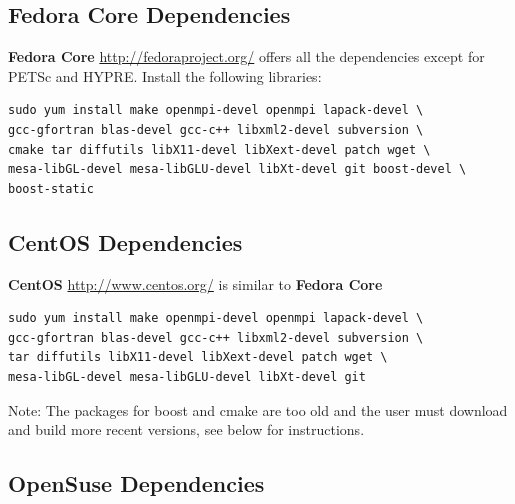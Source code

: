 \documentclass[12pt]{article}
\newcommand{\TT}[1]{\tt{#1} \normalfont}
\begin{document}

  

\subsection{Fedora Core  Dependencies}

\textbf{Fedora Core} \url{http://fedoraproject.org/} offers all the
dependencies except for PETSc and HYPRE.  Install the following
libraries:

\begin{verbatim}
sudo yum install make openmpi-devel openmpi lapack-devel \
gcc-gfortran blas-devel gcc-c++ libxml2-devel subversion \ 
cmake tar diffutils libX11-devel libXext-devel patch wget \
mesa-libGL-devel mesa-libGLU-devel libXt-devel git boost-devel \
boost-static
\end{verbatim} 


\subsection{CentOS  Dependencies}

\textbf{CentOS} \url{http://www.centos.org/} is similar to \textbf{Fedora
Core} 

\begin{verbatim}
sudo yum install make openmpi-devel openmpi lapack-devel \
gcc-gfortran blas-devel gcc-c++ libxml2-devel subversion \ 
tar diffutils libX11-devel libXext-devel patch wget \
mesa-libGL-devel mesa-libGLU-devel libXt-devel git
\end{verbatim} 

Note:  The packages for boost and cmake are too old and the user must
download and build more recent versions, see below for instructions.

\subsection{OpenSuse  Dependencies}
\end{document}
